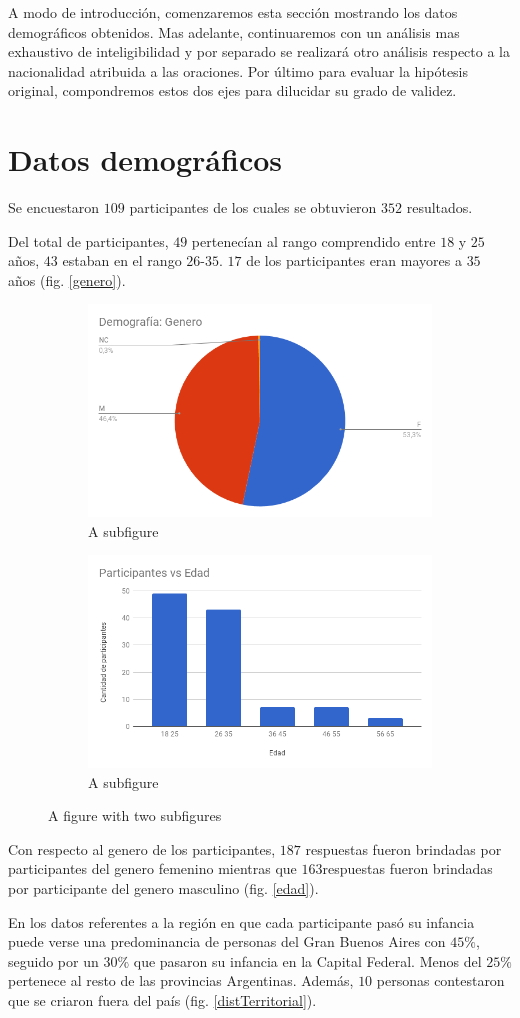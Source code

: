 
A modo de introducción, comenzaremos esta sección mostrando los datos demográficos obtenidos. Mas adelante, continuaremos con un análisis mas exhaustivo de inteligibilidad y por separado se realizará otro análisis respecto a la nacionalidad atribuida a las oraciones. Por último para evaluar la hipótesis original, compondremos estos dos ejes para dilucidar su grado de validez.

\section{Datos demográficos}

Se encuestaron $109$ participantes de los cuales se obtuvieron $352$ resultados.

Del total de participantes, $49$ pertenecían al rango comprendido entre $18$ y $25$ años, $43$ estaban en el rango $26$-$35$. $17$ de los participantes eran mayores a $35$ años (fig. \ref{genero}).

\begin{figure}
\centering
\begin{subfigure}{.5\textwidth}
  \centering
	\includegraphics[width=.3\linewidth]{datosDemograficos/genero.png}
  \caption{A subfigure}
  \label{fig:sub1}
\end{subfigure}%
\begin{subfigure}{.5\textwidth}
  \centering
	\includegraphics[width=.3\linewidth]{datosDemograficos/edad.png}
  \caption{A subfigure}
  \label{fig:sub2}
\end{subfigure}
\caption{A figure with two subfigures}
\label{fig:test}
\end{figure}

Con respecto al genero de los participantes, $187$ respuestas fueron brindadas por participantes del genero femenino mientras que $163$respuestas fueron brindadas por participante del genero masculino (fig. \ref{edad}).

En los datos referentes a la región en que cada participante pasó su infancia puede verse una predominancia de personas del Gran Buenos Aires con $45\%$, seguido por un $30\%$ que pasaron su infancia en la Capital Federal. Menos del $25\%$ pertenece al resto de las provincias Argentinas. Además, $10$ personas contestaron que se criaron fuera del país (fig. \ref{distTerritorial}).


